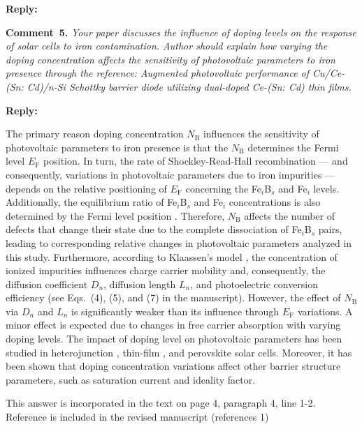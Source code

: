 \documentclass[a4paper,fleqn]{cas-sc}
\begin{document}
\noindent
\textcolor[rgb]{0.51,0.00,0.00}{\textbf{Reply:}}




\vspace{1cm}
\noindent
\textcolor[rgb]{0.00,0.50,1.00}{\textbf{Comment~5.}}
\emph{Your paper discusses the influence of doping levels on the response of solar cells to iron contamination. 
Author should explain how varying the doping concentration affects the sensitivity of photovoltaic parameters to iron presence through the reference:
Augmented photovoltaic performance of Cu/Ce-(Sn: Cd)/n-Si Schottky barrier diode utilizing dual-doped Ce-(Sn: Cd) thin films.}

\noindent
\textcolor[rgb]{0.51,0.00,0.00}{\textbf{Reply:}}


The primary reason doping concentration $N_\mathrm{B}$ influences the sensitivity of photovoltaic 
parameters to iron presence is that the $N_\mathrm{B}$ determines the Fermi level $E_\mathrm{F}$ position. 
In turn, the rate of Shockley-Read-Hall recombination --- 
and consequently, variations in photovoltaic parameters due to iron impurities --- 
depends on the relative positioning of $E_\mathrm{F}$ concerning the Fe$_i$B$_s$ and Fe$_i$ levels. 
Additionally, the equilibrium ratio of Fe$_i$B$_s$ and Fe$_i$ concentrations is also determined by the Fermi level position \cite{FeB:kinetic,MurphyJAP2011}.
Therefore, $N_\mathrm{B}$ affects the number of defects that change their state due to the complete dissociation of Fe$_i$B$_s$ pairs,
leading to corresponding relative changes in photovoltaic parameters analyzed in this study.
Furthermore, according to Klaassen’s model \cite{KLAASSEN953},
the concentration of ionized impurities influences charge carrier mobility and, consequently, the diffusion coefficient $D_n$, diffusion length $L_n$,
and photoelectric conversion efficiency (see Eqs.~(4), (5), and (7) in the manuscript).
However, the effect of $N_\mathrm{B}$ via $D_n$ and $L_n$ is significantly weaker than its influence through $E_\mathrm{F}$ variations.
A minor effect is expected due to changes in free carrier absorption with varying doping levels.
The impact of doping level on photovoltaic parameters has been studied in heterojunction \cite{Sultana2024}, 
thin-film \cite{Akila2024},
and perovskite \cite{MasumMia2025} solar cells.
Moreover, it has been shown \cite{Akila2024} that
doping concentration variations affect other barrier structure parameters, such as saturation current and ideality factor.


This answer is incorporated in the text on page 4, paragraph 4, line 1-2.
Reference  is included in the revised manuscript (references 1)
 
\end{document}
